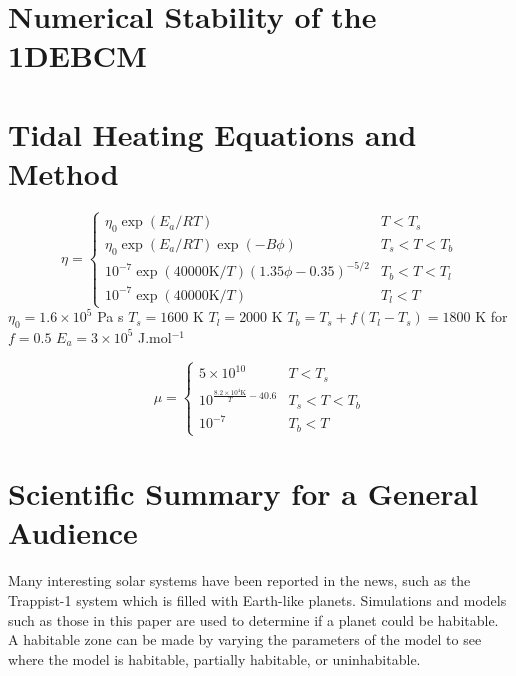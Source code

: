 \documentclass[12pt, onecolumn]{revtex4-2}    %
\begin{document}
\section{Numerical Stability of the 1DEBCM} \label{appx:NumStability}

\section{Tidal Heating Equations and Method} \label{appx:TidalHeatingEquationsMethod}
\begin{equation}
  \eta = 
  \begin{cases}
    \eta_0 \exp{(E_a / R T)} & T < T_s \\
    \eta_0 \exp{(E_a / R T)} \exp{(-B \phi)} & T_s < T < T_b \\
    10^{-7} \exp{(40000\text{K} / T)} (1.35 \phi - 0.35)^{-5/2} & T_b < T < T_l \\
    10^{-7} \exp{(40000\text{K} / T)} & T_l < T
  \end{cases}
\end{equation}
$\eta_0 = 1.6 \times 10^5$ Pa s
$T_s = 1600$ K
$T_l = 2000$ K
$T_b = T_s + f (T_l - T_s) = 1800$ K for $f=0.5$
$E_a = 3\times10^5$ J.mol$^{-1}$

\begin{equation}
  \mu = 
  \begin{cases}
    5\times10^{10} & T < T_s \\
    10^{\frac{8.2\times10^4\text{K}}{T} - 40.6} & T_s < T < T_b \\
    10^{-7} & T_b < T
  \end{cases}
\end{equation}

\clearpage

\section*{Scientific Summary for a General Audience}

Many interesting solar systems have been reported in the news, such as the Trappist-1 system which is filled with Earth-like planets.
Simulations and models such as those in this paper are used to determine if a planet could be habitable.
A habitable zone can be made by varying the parameters of the model to see where the model is habitable, partially habitable, or uninhabitable.
\end{document}
